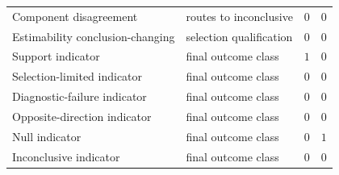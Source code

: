 \begin{table}[t]
\begin{tabularx}{\textwidth}{@{}p{3.9cm}p{3.0cm}p{3.0cm}p{3.0cm}@{}}
Component disagreement & routes to inconclusive & \(0\) & \(0\) \\
Estimability conclusion-changing & selection qualification & \(0\) & \(0\) \\
Support indicator & final outcome class & \(1\) & \(0\) \\
Selection-limited indicator & final outcome class & \(0\) & \(0\) \\
Diagnostic-failure indicator & final outcome class & \(0\) & \(0\) \\
Opposite-direction indicator & final outcome class & \(0\) & \(0\) \\
Null indicator & final outcome class & \(0\) & \(1\) \\
Inconclusive indicator & final outcome class & \(0\) & \(0\) \\
\bottomrule
\end{tabularx}
\end{table}
